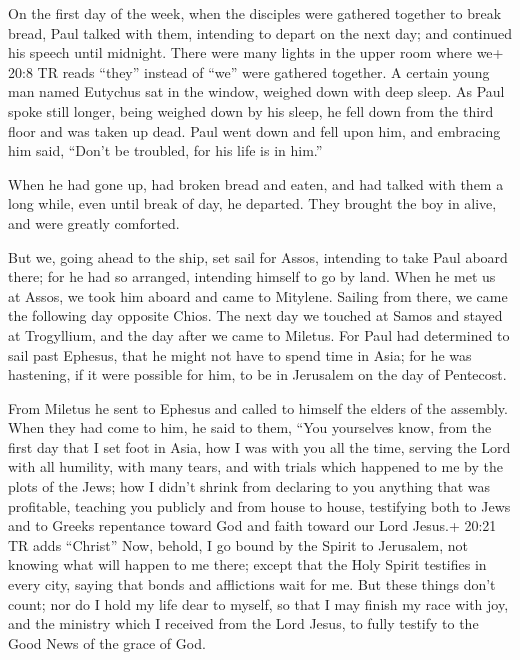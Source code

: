  On the first day of the week, when the disciples were
gathered together to break bread, Paul talked with them, intending to
depart on the next day; and continued his speech until midnight.
 There were many lights in the upper room where we+ 20:8 TR
reads ``they'' instead of ``we'' were gathered together.  A
certain young man named Eutychus sat in the window, weighed down with
deep sleep. As Paul spoke still longer, being weighed down by his sleep,
he fell down from the third floor and was taken up dead. 
Paul went down and fell upon him, and embracing him said, ``Don't be
troubled, for his life is in him.''

 When he had gone up, had broken bread and eaten, and had
talked with them a long while, even until break of day, he departed.
 They brought the boy in alive, and were greatly comforted.

 But we, going ahead to the ship, set sail for Assos,
intending to take Paul aboard there; for he had so arranged, intending
himself to go by land.  When he met us at Assos, we took
him aboard and came to Mitylene.  Sailing from there, we
came the following day opposite Chios. The next day we touched at Samos
and stayed at Trogyllium, and the day after we came to Miletus.
 For Paul had determined to sail past Ephesus, that he
might not have to spend time in Asia; for he was hastening, if it were
possible for him, to be in Jerusalem on the day of Pentecost.

 From Miletus he sent to Ephesus and called to himself the
elders of the assembly.  When they had come to him, he said
to them, ``You yourselves know, from the first day that I set foot in
Asia, how I was with you all the time,  serving the Lord
with all humility, with many tears, and with trials which happened to me
by the plots of the Jews;  how I didn't shrink from
declaring to you anything that was profitable, teaching you publicly and
from house to house,  testifying both to Jews and to Greeks
repentance toward God and faith toward our Lord Jesus.+ 20:21 TR adds
``Christ''  Now, behold, I go bound by the Spirit to
Jerusalem, not knowing what will happen to me there; 
except that the Holy Spirit testifies in every city, saying that bonds
and afflictions wait for me.  But these things don't count;
nor do I hold my life dear to myself, so that I may finish my race with
joy, and the ministry which I received from the Lord Jesus, to fully
testify to the Good News of the grace of God.

